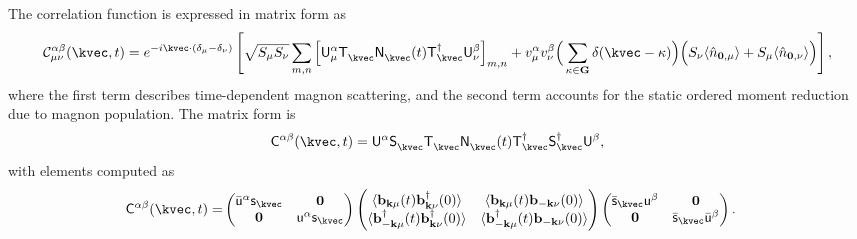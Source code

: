The correlation function is expressed in matrix form as
\begin{equation}
    \mathcal{C}^{\alpha\beta}_{\mu\nu} (\kvec, t)
    = e^{ - i \kvec \cdot (\mathbf{\delta}_{\mu} - \mathbf{\delta}_{\nu})}  
    \left[
    \sqrt{S_{\mu}S_{\nu}} \sum_{m,n}
    \Big[ \mathsf{U}^{\alpha}_{\mu}
    \mathsf{T}_{\kvec}^{\phantom\dagger} \mathsf{N}_{\kvec}^{\phantom\dagger} (t) \mathsf{T}_{\kvec}^{\dagger}
    \mathsf{U}^{\beta}_{\nu} \Big]_{m,n}
    + v_{\mu}^{\alpha} v_{\nu}^{\beta}
    \Big( \sum_{\kappa \in \mathbf{G}} \delta(\kvec - \kappa) \Big)
    \Big( S_{\nu}\langle \hat{n}_{\mathbf{0}, \mu} \rangle + S_{\mu}\langle \hat{n}_{\mathbf{0}, \nu} \rangle \Big)
    \right],
\end{equation}
where the first term describes time-dependent magnon scattering, and the second term accounts for the static ordered moment reduction due to magnon population. The matrix form is
\begin{equation}\label{eq: matrix form of spin-spin correlation matrix}
    \mathsf{C}^{\alpha\beta} (\kvec, t)
    = 
    \mathsf{U}^{\alpha} 
    \mathsf{S}_{\kvec}^{\phantom \dagger} 
    \mathsf{T}_{\kvec}^{\phantom \dagger} 
    \mathsf{N}_{\kvec}^{\phantom \dagger}  (t)
    \mathsf{T}_{\kvec}^{         \dagger}
    \mathsf{S}_{\kvec}^{         \dagger}
    \mathsf{U}^{\beta},
\end{equation}
with elements computed as
\begin{align*}
    \mathsf{C}^{\alpha\beta} (\kvec, t) = & 
    \begin{pmatrix}
        \bar{\mathsf{u}}^{\alpha} \mathsf{s}_{\kvec}  & \mathbf{0} \\
        \mathbf{0} & \mathsf{u}^{\alpha} \mathsf{s}_{\kvec} \\
    \end{pmatrix}
    \begin{pmatrix}     
        \langle \mathbf{b}_{ \mathbf{k}\mu}           (t)    \mathbf{b}_{ \mathbf{k}\nu}^{\dagger} (0)    \rangle & 
        \langle \mathbf{b}_{ \mathbf{k}\mu}           (t)    \mathbf{b}_{-\mathbf{k}\nu}           (0)    \rangle \\
        \langle \mathbf{b}_{-\mathbf{k}\mu}^{\dagger} (t)    \mathbf{b}_{ \mathbf{k}\nu}^{\dagger} (0)    \rangle & 
        \langle \mathbf{b}_{-\mathbf{k}\mu}^{\dagger} (t)    \mathbf{b}_{-\mathbf{k}\nu}           (0)    \rangle
    \end{pmatrix}
    \begin{pmatrix}
        \bar{\mathsf{s}}_{\kvec} \mathsf{u}^{\beta} & \mathbf{0} \\
        \mathbf{0} & \bar{\mathsf{s}}_{\kvec} \bar{\mathsf{u}}^{\beta} \\
    \end{pmatrix}.
\end{align*}
